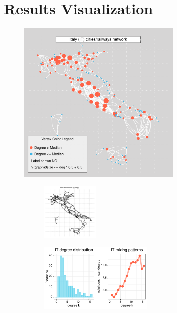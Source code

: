\section{Results Visualization}
\begin{figure}[H]
\centering
    \includegraphics[width = 0.7\textwidth]{latex_source/images/railways/city_networks/IT_network.pdf}

\begin{subfigure}{}
    \includegraphics[width = 0.3\textwidth]{latex_source/images/railways/raw_networks/raw_IT_network.pdf}
\end{subfigure}
\begin{subfigure}{}
    \includegraphics[width = 0.6\textwidth]{latex_source/images/railways/city_network_analysis/IT_analysis.pdf}
\end{subfigure}
\caption{}
\end{figure}
\newpage